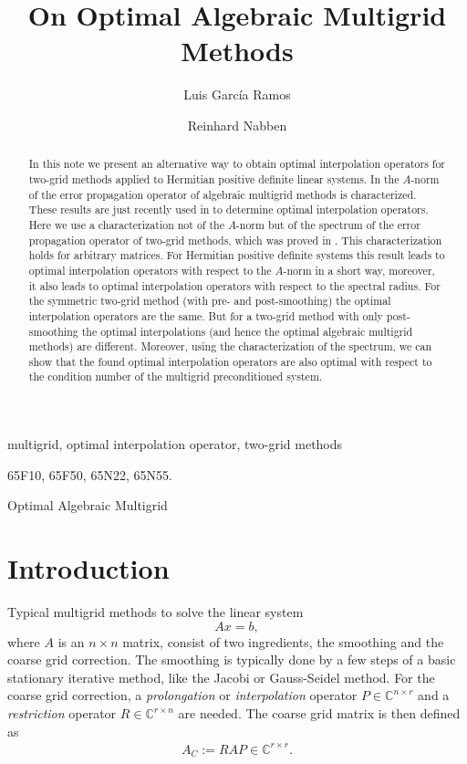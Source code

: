 \documentclass[final]{siamltex}
\author{
Luis Garc\'{i}a Ramos\footnotemark[1]
\and
Reinhard Nabben\footnotemark[1]
}
\title{On Optimal Algebraic Multigrid Methods}
\newcommand{\innCrr}{\in\mathbb{C}^{r\times r}}
\newcommand{\beq}{\begin{eqnarray}}
\newcommand{\eeq}{\end{eqnarray}}
\numberwithin{equation}{section}
\newcommand{\Crn}{\mathbb{C}^{r \times n}}
\newcommand{\Cnr}{\mathbb{C}^{n \times r}}
\begin{document}
\maketitle
\renewcommand{\thefootnote}{\fnsymbol{footnote}}

\renewcommand{\thefootnote}{\arabic{footnote}}
\begin{abstract}
In this note we present an alternative way to obtain optimal
interpolation operators for two-grid methods applied to Hermitian positive
definite linear systems.  In \cite{FalVZ05,Zik08} the $A$-norm of the error
propagation operator of algebraic multigrid methods is characterized. These
results are just recently used in \cite{XuZ17, Bra18} to determine optimal
interpolation operators. Here we use a characterization not of the $A$-norm but
of the spectrum of the  error propagation operator of two-grid methods, which
was proved in  \cite{GarKN18}. This characterization holds for arbitrary
matrices. For Hermitian positive definite systems this result   leads to
optimal interpolation operators with respect to the $A$-norm in a short way, 
moreover, it also leads to optimal interpolation operators with respect to the
spectral radius. For the symmetric two-grid method (with pre- and 
post-smoothing)
the optimal interpolation operators are the same. But for a two-grid method
with only post-smoothing the optimal interpolations (and hence the
optimal algebraic multigrid
methods) are  different.  Moreover, using the  characterization of the
spectrum,
we can show that the found  optimal interpolation operators are also optimal
with
respect to the condition number of the multigrid preconditioned system.  
\end{abstract}


\begin{keywords}
multigrid, optimal interpolation operator, two-grid methods
\end{keywords}

\begin{AMS}
65F10, 65F50, 65N22, 65N55.
\end{AMS}

\pagestyle{myheadings}
\thispagestyle{plain}
 {Optimal Algebraic Multigrid}

\section{Introduction}
Typical multigrid methods to solve the linear system 
\[
Ax = b,
\]
where $A$ is an $n \times n$ matrix, consist  of two ingredients, the smoothing
and  the
coarse grid correction. The smoothing is typically done by a
few
steps of a basic stationary iterative method, like the Jacobi or Gauss-Seidel
method.  For the coarse grid correction,
 a {\it prolongation} or {\it interpolation}
operator $P \in \Cnr$ and a   {\it
restriction} operator $R \in \Crn$  are needed. The coarse grid matrix is then
defined as
\beq \label{def:multAC}
A_C :=  RAP \innCrr.
\eeq 
\end{document}
